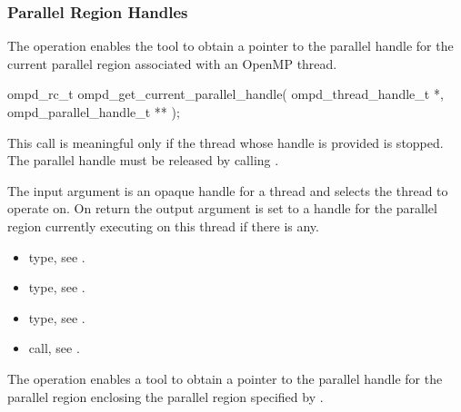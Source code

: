 \subsubsection{Parallel Region Handles}

\label{subsubsubsec:ompd_get_current_parallel_handle}
\summary
The   operation enables the tool to obtain a pointer to
the parallel handle for the current parallel region associated with an OpenMP thread.

\format

\begin{cspecific}
\begin{ompSyntax}
ompd_rc_t ompd_get_current_parallel_handle(
  ompd_thread_handle_t *,
  ompd_parallel_handle_t **
);
\end{ompSyntax}
\end{cspecific}


\descr
This call is meaningful only if the thread whose handle is provided is stopped. The parallel handle
must be released by calling .

\argdesc
The input argument  is an opaque handle for a thread and selects the thread to operate on.
On return the output argument  is set to a handle for the parallel region
currently executing on this thread if there is any.

\crossreferences
\begin{itemize}
	\item {} type, see .
	\item {} type, see .
	\item {} type, see .
	\item {} call, see .
\end{itemize}

\label{subsubsubsec:ompd_get_enclosing_parallel_handle}
\summary
The    operation enables a tool to obtain a
pointer to the parallel handle for the parallel region enclosing the parallel region specified by
.

